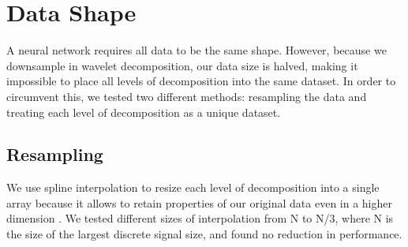 \documentclass{turabian-thesis}[12pt]
\begin{document}





















\section{Data Shape}

A neural network requires all data to be the same shape. However, because we downsample in wavelet decomposition, our data size is halved, making it impossible to place all levels of decomposition into the same dataset. In order to circumvent this, we tested two different methods: resampling the data and treating each level of decomposition as a unique dataset.


\subsection{Resampling}

We use spline interpolation to resize each level of decomposition into a single array because it allows to retain properties of our original data even in a higher dimension \cite{gregory_shape_1985}. We tested different sizes of interpolation from N to N/3, where N is the size of the largest discrete signal size, and found no reduction in performance.
 
\end{document}
